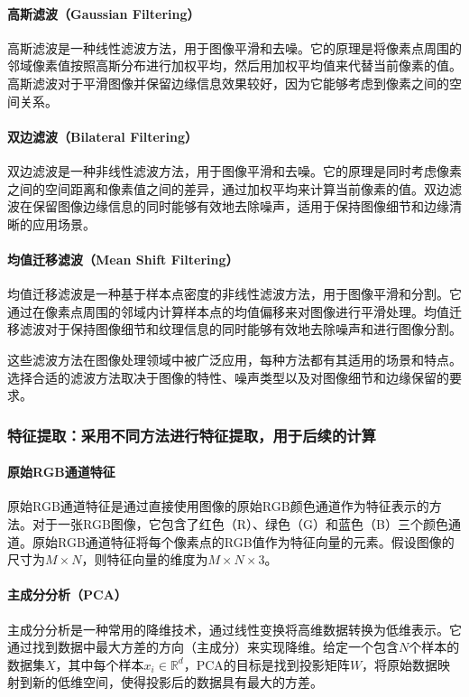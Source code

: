 \documentclass[12pt,hyperref,a4paper,UTF8]{ctexart}
\begin{document}
\paragraph{高斯滤波（Gaussian Filtering）}
高斯滤波是一种线性滤波方法，用于图像平滑和去噪。它的原理是将像素点周围的邻域像素值按照高斯分布进行加权平均，然后用加权平均值来代替当前像素的值。高斯滤波对于平滑图像并保留边缘信息效果较好，因为它能够考虑到像素之间的空间关系。
\paragraph{双边滤波（Bilateral Filtering）}
双边滤波是一种非线性滤波方法，用于图像平滑和去噪。它的原理是同时考虑像素之间的空间距离和像素值之间的差异，通过加权平均来计算当前像素的值。双边滤波在保留图像边缘信息的同时能够有效地去除噪声，适用于保持图像细节和边缘清晰的应用场景。
\paragraph{均值迁移滤波（Mean Shift Filtering）}
均值迁移滤波是一种基于样本点密度的非线性滤波方法，用于图像平滑和分割。它通过在像素点周围的邻域内计算样本点的均值偏移来对图像进行平滑处理。均值迁移滤波对于保持图像细节和纹理信息的同时能够有效地去除噪声和进行图像分割。
\par
这些滤波方法在图像处理领域中被广泛应用，每种方法都有其适用的场景和特点。选择合适的滤波方法取决于图像的特性、噪声类型以及对图像细节和边缘保留的要求。


\subsubsection{特征提取：采用不同方法进行特征提取，用于后续的计算}
\paragraph{原始RGB通道特征}
原始RGB通道特征是通过直接使用图像的原始RGB颜色通道作为特征表示的方法。对于一张RGB图像，它包含了红色（R）、绿色（G）和蓝色（B）三个颜色通道。原始RGB通道特征将每个像素点的RGB值作为特征向量的元素。假设图像的尺寸为$M\times N$，则特征向量的维度为$M\times N\times 3$。

\paragraph{主成分分析（PCA）}
主成分分析是一种常用的降维技术，通过线性变换将高维数据转换为低维表示。它通过找到数据中最大方差的方向（主成分）来实现降维。给定一个包含$N$个样本的数据集$X$，其中每个样本$x_i\in \mathbb{R}^d$，PCA的目标是找到投影矩阵$W$，将原始数据映射到新的低维空间，使得投影后的数据具有最大的方差。
\end{document}
